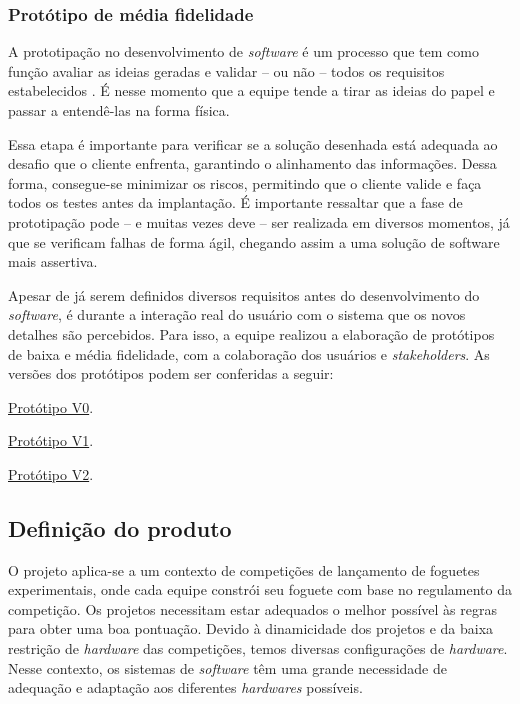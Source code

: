 \subsubsection{Protótipo de média fidelidade}
\label{prototipo}

\par A prototipação no desenvolvimento de \textit{software} é um processo que tem como função avaliar as ideias geradas e validar – ou não – todos os requisitos estabelecidos \cite{lilley2004development}. É nesse momento que a equipe tende a  tirar as ideias do papel e passar a entendê-las na forma física.

\par Essa etapa é importante para verificar se a solução desenhada está adequada ao desafio que o cliente enfrenta, garantindo o alinhamento das informações. Dessa forma, consegue-se minimizar os riscos, permitindo que o cliente valide e faça todos os testes antes da implantação. É importante ressaltar que a fase de prototipação pode – e muitas vezes deve – ser realizada em diversos momentos, já que se verificam falhas de forma ágil, chegando assim a uma solução de software mais assertiva.

\par Apesar de já serem definidos diversos requisitos antes do desenvolvimento do \textit{software}, é durante a interação real do usuário com o sistema que os novos detalhes são percebidos. Para isso, a equipe realizou a elaboração de protótipos de baixa e média fidelidade, com a colaboração dos usuários e \textit{stakeholders}. As versões dos protótipos podem ser conferidas a seguir:


\href{https://bit.ly/35xe23N}{Protótipo V0}.

\href{https://bit.ly/2FW3oep}{Protótipo V1}.

\href{https://bit.ly/34pAfS2}{Protótipo V2}.

\subsection{Definição do produto}

\par O projeto aplica-se a um contexto de competições de lançamento de foguetes experimentais, onde cada equipe constrói seu foguete com base no regulamento da competição. Os projetos necessitam estar adequados o melhor possível às regras para obter uma boa pontuação. Devido à dinamicidade dos projetos e da baixa restrição de \textit{hardware} das competições, temos diversas configurações de \textit{hardware}. Nesse contexto, os sistemas de \textit{software} têm uma grande necessidade de adequação e adaptação aos diferentes \textit{hardwares} possíveis.

